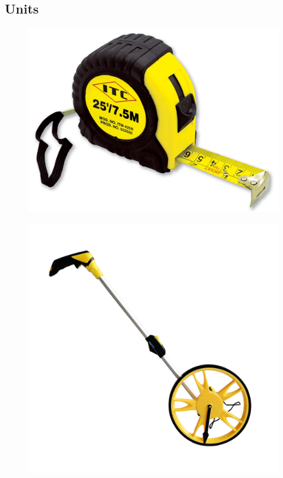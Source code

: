 \documentclass[12pt]{beamer}
\begin{document}
    \subsection{Units}
        \begin{frame}
            \begin{figure}
                \includegraphics[scale=0.1]{tapemeasure.jpg}
            \end{figure}
        \end{frame}
        \begin{frame}
            \begin{figure}
                \includegraphics[scale=0.5]{rollermeasure.png}
            \end{figure}
        \end{frame}
\end{document}

